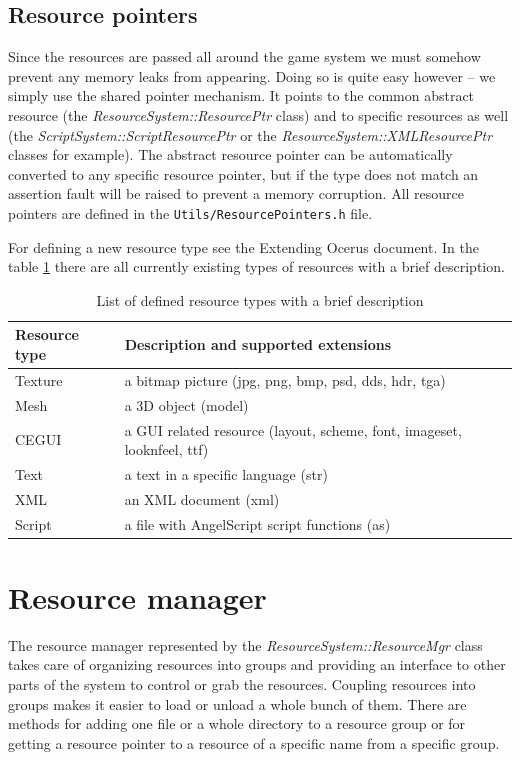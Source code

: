 \documentclass[a4paper, 12pt]{report}
\begin{document}
\subsection{Resource pointers}

Since the resources are passed all around the game system we must somehow prevent any memory leaks from appearing. Doing so is quite easy however -- we simply use the shared pointer mechanism. It points to the common abstract resource (the \emph{ResourceSystem::ResourcePtr} class) and to specific resources as well (the \emph{ScriptSystem::ScriptResourcePtr} or the \emph{ResourceSystem::XMLResourcePtr} classes for example). The abstract resource pointer can be automatically converted to any specific resource pointer, but if the type does not match an assertion fault will be raised to prevent a memory corruption. All resource pointers are defined in the \verb'Utils/ResourcePointers.h' file.

For defining a new resource type see the Extending Ocerus document. In the table \ref{tab:resource-types} there are all currently existing types of resources with a brief description.

\begin{table}[htbp]
	\centering
		\begin{tabular}{|p{0.20\hsize}|p{0.73\hsize}|}
			\hline
			Resource type & Description and supported extensions\\
			\hline
			Texture & a bitmap picture (jpg, png, bmp, psd, dds, hdr, tga)\\
			Mesh & a 3D object (model)\\
			CEGUI & a GUI related resource (layout, scheme, font, imageset, looknfeel, ttf)\\
			Text & a text in a specific language (str)\\
			XML & an XML document (xml)\\
			Script & a file with AngelScript script functions (as)\\
			\hline
		\end{tabular}
	\caption[List of defined resource types]{List of defined resource types with a brief description}
	\label{tab:resource-types}
\end{table}

\section{Resource manager}

The resource manager represented by the \emph{ResourceSystem::ResourceMgr} class takes care of organizing resources into groups and providing an interface to other parts of the system to control or grab the resources. Coupling resources into groups makes it easier to load or unload a whole bunch of them. There are methods for adding one file or a whole directory to a resource group or for getting a resource pointer to a resource of a specific name from a specific group.
\end{document}
